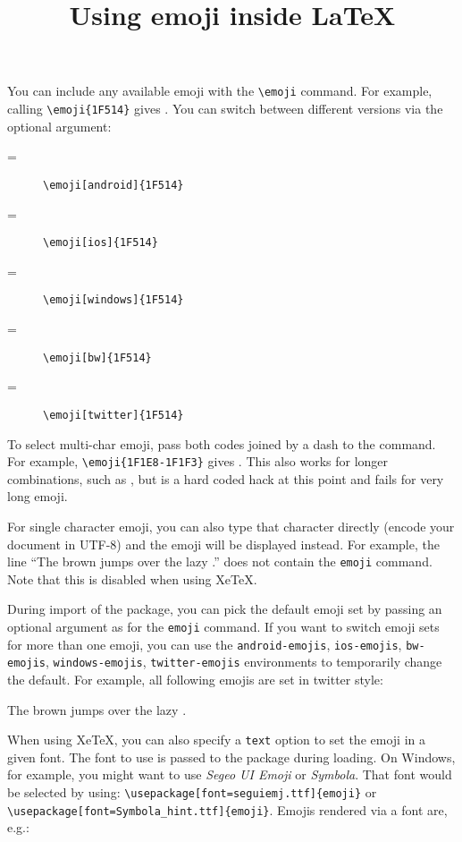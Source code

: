 \documentclass{article}
\title{Using emoji inside \LaTeX}
\newcommand{\dogline}{The \emoji{23E9} brown \emoji{1F43A} jumps over the lazy \emoji{1F436}.}
\newcommand{\dogline}{The \emoji{23E9} brown \emoji{1F43A} jumps over the lazy \emoji{1F436}.}
\newcommand{\dogline}{The ⏩ brown 🐺 jumps over the lazy 🐶.}
\begin{document}
\maketitle

You can include any available emoji with the \verb|\emoji| command. For example, calling \verb|\emoji{1F514}| gives . You can switch between different versions via the optional argument:
\begin{description}
\item[{} =] \verb|\emoji[android]{1F514}|
\item[{} =] \verb|\emoji[ios]{1F514}|
\item[{} =] \verb|\emoji[windows]{1F514}|
\item[{} =] \verb|\emoji[bw]{1F514}|
\item[{} =] \verb|\emoji[twitter]{1F514}|
\end{description}
To select multi-char emoji, pass both codes joined by a dash to the command. For example, \verb|\emoji{1F1E8-1F1F3}| gives .
This also works for longer combinations, such as , but is a hard coded hack at this point and fails for very long emoji.

For single character emoji, you can also type that character directly (encode your document in UTF-8) and the emoji will be displayed instead. For example, the line ``\dogline'' does not contain the \verb|emoji| command. Note that this is disabled when using XeTeX. 

During import of the package, you can pick the default emoji set by passing an optional argument as for the \verb|emoji| command. If you want to switch emoji sets for more than one emoji, you can use the \verb|android-emojis|, \verb|ios-emojis|, \verb|bw-emojis|, \verb|windows-emojis|, \verb|twitter-emojis| environments to temporarily change the default. For example, all following emojis are set in twitter style:
\begin{twitter-emojis}
\dogline
\end{twitter-emojis}

When using XeTeX, you can also specify a \verb|text| option to set the emoji in a given font. The font to use is passed to the package during loading. On Windows, for example, you might want to use \textit{Segeo UI Emoji} or \textit{Symbola}. That font would be selected by using: \verb|\usepackage[font=seguiemj.ttf]{emoji}| or \verb|\usepackage[font=Symbola_hint.ttf]{emoji}|. Emojis rendered via a font are, e.g.: 
\begin{text-emojis}
  
\end{text-emojis}
\end{document}

